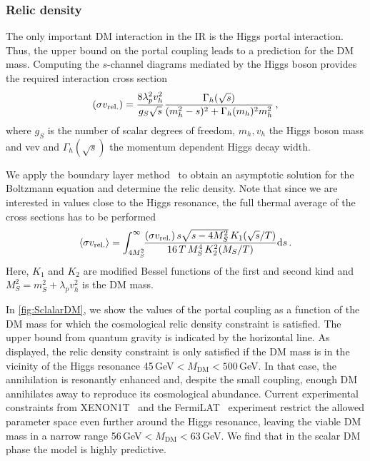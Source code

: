 \documentclass[aps,prd,twocolumn,preprintnumbers,superscriptaddress,nobibnotes,floatfix,longbibliography]{revtex4-1}
\newcommand{\MDM}{M_{\text{DM}}}
\begin{document}
\subsubsection*{Relic density}
The only important DM interaction in the IR is the Higgs portal interaction. Thus, the upper bound on the portal coupling leads to a prediction for the DM mass.
Computing the $s$-channel diagrams mediated by the Higgs boson provides the required interaction cross section~\cite{1509.04282}
\begin{align}
(\sigma v_{\rm rel.})= \frac{8 \lambda_p^2 v_h^2 }{g_S \sqrt{s} } \frac{\Gamma_h(\sqrt{s} )}{(m_h^2-s)^2 + \Gamma_{h}(m_h)^2 m_h^2 }\,,
\end{align}
where $g_S$ is the number of scalar degrees of freedom, $m_h, v_h$ the Higgs boson mass and vev and $\Gamma_h(\sqrt{s})$ the momentum dependent Higgs decay width.

We apply the boundary layer method~\cite{1203.1822} to obtain an asymptotic solution for the Boltzmann equation and determine the relic density. Note that since we are interested in values close to the Higgs resonance, the full thermal average of the cross sections has to be performed~\cite{Gondolo:1990dk}
\begin{align}
\langle \sigma v_{\rm rel.}\rangle = \int_{4 M_S^2}^\infty \!\! \frac{(\sigma v_{\rm rel.})\,s \sqrt{s- 4 M_S^2}\, K_1(\sqrt{s}/T)}{16\, T\, M_S^4\, K_2^2(M_S/T)} \mathrm ds \,.
\end{align}
Here, $K_1$ and $K_2$ are modified Bessel functions of the first and second kind and $M_S^2 = m_S^2 + \lambda_p v_h^2$ is the DM mass.

In \autoref{fig:SclalarDM}, we show the values of the portal coupling as a function of the DM mass for which the cosmological relic density constraint is satisfied.
The upper bound from quantum gravity is indicated by the horizontal line.
As displayed, the relic density constraint is only satisfied if the DM mass is in the vicinity of the Higgs resonance 45\,GeV$ <  \MDM < 500$\,GeV.
In that case, the annihilation is resonantly enhanced and, despite the small coupling, enough DM annihilates away to reproduce its cosmological abundance. Current experimental constraints from XENON1T~\cite{1805.12562} and the FermiLAT~\cite{1601.06590} experiment restrict the allowed parameter space even further around the Higgs resonance, leaving the viable DM mass in a narrow range 56\,GeV$ <  \MDM < 63$\,GeV. We find that in the scalar DM phase the model is highly predictive. 
\end{document}

